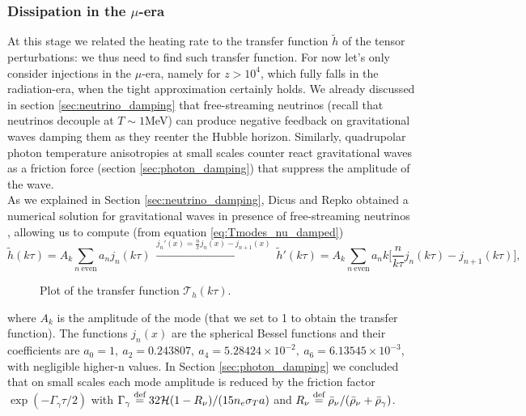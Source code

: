 \subsubsection{Dissipation in the $\mu$-era}
At this stage we related the heating rate to the transfer function $\tilde h$ of the tensor perturbations: we thus need to find such transfer function. For now let's only consider injections in the $\mu$-era, namely for $z>10^4$, which fully falls in the radiation-era, when the tight approximation certainly holds. We already discussed in section \ref{sec:neutrino_damping} that free-streaming neutrinos (recall that neutrinos decouple at $T\sim 1$MeV) can produce negative feedback on gravitational waves damping them as they reenter the Hubble horizon. Similarly, quadrupolar photon temperature anisotropies at small scales counter react gravitational waves as a friction force (section \ref{sec:photon_damping}) that suppress the amplitude of the wave.\\ As we explained in Section \ref{sec:neutrino_damping}, Dicus and Repko obtained a numerical solution for gravitational waves in presence of free-streaming neutrinos \cite{Dicus_Repko}, allowing us to compute (from equation \eqref{eq:Tmodes_nu_damped})
$$
\tilde h(k\tau)=A_k\sum_{n\ \text{even}}a_n j_n(k\tau)\ \xrightarrow{j_n'(x)=\frac{n}{x}j_{n}(x)-j_{n+1}(x)}\ \tilde h'(k\tau)=A_k\sum_{n\ \text{even}}a_nk\bigg[\frac{n}{k\tau}j_n(k\tau)-j_{n+1}(k\tau)\bigg],
$$
\begin{figure}
    \centering
{}
\caption{Plot of the transfer function $\mathcal T_h(k\tau)$. }
\label{fig:Th}
\end{figure}
where $A_k$ is the amplitude of the mode (that we set to 1 to obtain the transfer function). The functions $j_n(x)$ are the spherical Bessel functions and their coefficients are $a_0=1,\ a_2=0.243807,\ a_4=5.28424\times10^{-2},\ a_6=6.13545\times10^{-3}$, with negligible higher-n values. In Section \ref{sec:photon_damping} we concluded that on small scales each mode amplitude is reduced by the friction factor $\exp(-\Gamma_\gamma\tau/2)$ with $\Gamma_\gamma\stackrel{\text{def}}{=}32 \mathcal{H}(1-R_\nu)/(15n_e\sigma_T a)$ and $R_\nu\stackrel{\text{def}}{=}\bar\rho_\nu/( \bar\rho_\nu+\bar\rho_\gamma)$. \\
